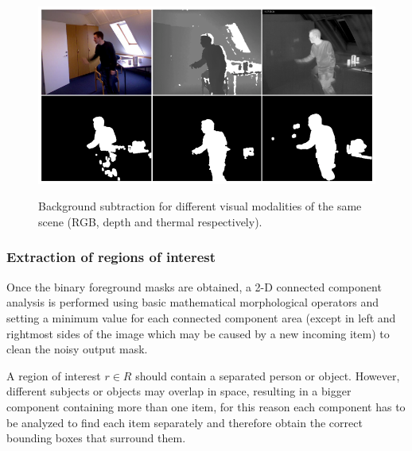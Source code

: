\documentclass[10pt,twocolumn,letterpaper]{article}
\begin{document}
 \begin{figure}[!h]
{\includegraphics[width=\linewidth]{bs.eps}}
\caption{Background subtraction for different visual
modalities of the same scene (RGB, depth and thermal respectively).
\label{fig:bscomparison}}
\end{figure}

\subsubsection{Extraction of regions of interest}
\label{sssec:extreg}
Once the binary foreground masks are obtained, a 2-D connected component analysis is performed using basic mathematical morphological operators and setting a minimum value for each connected component area (except in left and rightmost sides of the image which may be caused by a new incoming item) to clean the noisy output mask. 

A region of interest $r \in R$ should contain a separated person or object. However, different subjects or objects may overlap in space, resulting in a bigger component containing more than one item, for this reason each component has to be analyzed to find each item separately and therefore obtain the correct bounding boxes that surround them.
 
\end{document}
